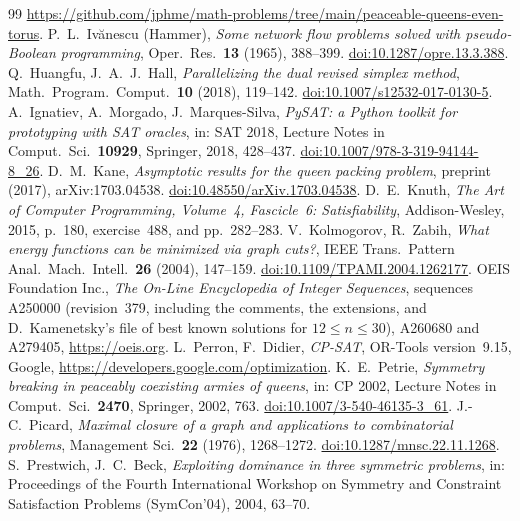 \documentclass[11pt]{article}
\theoremstyle{remark}
\begin{document}
\begin{thebibliography}{99}
\url{https://github.com/jphme/math-problems/tree/main/peaceable-queens-even-torus}.
 P.~L.~Ivănescu (Hammer), \emph{Some network flow problems solved with pseudo-Boolean
programming}, Oper.\ Res.\ \textbf{13} (1965), 388--399.
\href{https://doi.org/10.1287/opre.13.3.388}{doi:10.1287/opre.13.3.388}.
 Q.~Huangfu, J.~A.~J.~Hall, \emph{Parallelizing the dual revised simplex method}, Math.\
Program.\ Comput.\ \textbf{10} (2018), 119--142.
\href{https://doi.org/10.1007/s12532-017-0130-5}{doi:10.1007/s12532-017-0130-5}.
\bibitem{PySAT} A.~Ignatiev, A.~Morgado, J.~Marques-Silva, \emph{PySAT: a Python toolkit for prototyping
with SAT oracles}, in: SAT 2018, Lecture Notes in Comput.\ Sci.\ \textbf{10929}, Springer, 2018,
428--437. \href{https://doi.org/10.1007/978-3-319-94144-8_26}{doi:10.1007/978-3-319-94144-8\_26}.
\bibitem{Kane} D.~M.~Kane, \emph{Asymptotic results for the queen packing problem}, preprint (2017),
arXiv:1703.04538. \href{https://doi.org/10.48550/arXiv.1703.04538}{doi:10.48550/arXiv.1703.04538}.
\bibitem{Knuth} D.~E.~Knuth, \emph{The Art of Computer Programming, Volume~4, Fascicle~6:
Satisfiability}, Addison-Wesley, 2015, p.~180, exercise~488, and pp.~282--283.
\bibitem{KZ} V.~Kolmogorov, R.~Zabih, \emph{What energy functions can be minimized via graph cuts?},
IEEE Trans.\ Pattern Anal.\ Mach.\ Intell.\ \textbf{26} (2004), 147--159.
\href{https://doi.org/10.1109/TPAMI.2004.1262177}{doi:10.1109/TPAMI.2004.1262177}.
\bibitem{OEIS} OEIS Foundation Inc., \emph{The On-Line Encyclopedia of Integer Sequences}, sequences
A250000 (revision~379, including the comments, the extensions, and D.~Kamenetsky's file of best known
solutions for $12\le n\le30$), A260680 and A279405, \url{https://oeis.org}.
\bibitem{ORTools} L.~Perron, F.~Didier, \emph{CP-SAT}, OR-Tools version~9.15, Google,
\url{https://developers.google.com/optimization}.
 K.~E.~Petrie, \emph{Symmetry breaking in peaceably coexisting armies of queens}, in: CP 2002,
Lecture Notes in Comput.\ Sci.\ \textbf{2470}, Springer, 2002, 763.
\href{https://doi.org/10.1007/3-540-46135-3_61}{doi:10.1007/3-540-46135-3\_61}.
\bibitem{Picard} J.-C.~Picard, \emph{Maximal closure of a graph and applications to combinatorial
problems}, Management Sci.\ \textbf{22} (1976), 1268--1272.
\href{https://doi.org/10.1287/mnsc.22.11.1268}{doi:10.1287/mnsc.22.11.1268}.
\bibitem{PB} S.~Prestwich, J.~C.~Beck, \emph{Exploiting dominance in three symmetric problems}, in:
Proceedings of the Fourth International Workshop on Symmetry and Constraint Satisfaction Problems
(SymCon'04), 2004, 63--70.

\end{thebibliography}
\end{document}
